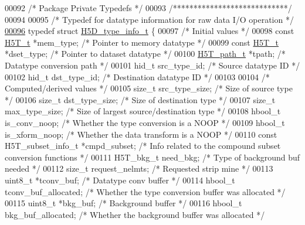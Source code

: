 \begin{DoxyCode}
00092 \textcolor{comment}{/* Package Private Typedefs */}
00093 \textcolor{comment}{/****************************/}
00094 
00095 \textcolor{comment}{/* Typedef for datatype information for raw data I/O operation */}
\hyperlink{struct_h5_d__type__info__t}{00096} \textcolor{keyword}{typedef} \textcolor{keyword}{struct }\hyperlink{struct_h5_d__type__info__t}{H5D\_type\_info\_t} \{
00097     \textcolor{comment}{/* Initial values */}
00098     \textcolor{keyword}{const} \hyperlink{struct_h5_t__t}{H5T\_t} *mem\_type;              \textcolor{comment}{/* Pointer to memory datatype */}
00099     \textcolor{keyword}{const} \hyperlink{struct_h5_t__t}{H5T\_t} *dset\_type;             \textcolor{comment}{/* Pointer to dataset datatype */}
00100     \hyperlink{struct_h5_t__path__t}{H5T\_path\_t} *tpath;                  \textcolor{comment}{/* Datatype conversion path */}
00101     hid\_t src\_type\_id;                  \textcolor{comment}{/* Source datatype ID */}
00102     hid\_t dst\_type\_id;                  \textcolor{comment}{/* Destination datatype ID */}
00103 
00104     \textcolor{comment}{/* Computed/derived values */}
00105     \textcolor{keywordtype}{size\_t} src\_type\_size;       \textcolor{comment}{/* Size of source type  */}
00106     \textcolor{keywordtype}{size\_t} dst\_type\_size;           \textcolor{comment}{/* Size of destination type */}
00107     \textcolor{keywordtype}{size\_t} max\_type\_size;           \textcolor{comment}{/* Size of largest source/destination type */}
00108     hbool\_t is\_conv\_noop;               \textcolor{comment}{/* Whether the type conversion is a NOOP */}
00109     hbool\_t is\_xform\_noop;              \textcolor{comment}{/* Whether the data transform is a NOOP */}
00110     \textcolor{keyword}{const} H5T\_subset\_info\_t *cmpd\_subset;   \textcolor{comment}{/* Info related to the compound subset conversion functions */}
00111     H5T\_bkg\_t need\_bkg;             \textcolor{comment}{/* Type of background buf needed */}
00112     \textcolor{keywordtype}{size\_t} request\_nelmts;      \textcolor{comment}{/* Requested strip mine */}
00113     uint8\_t *tconv\_buf;                 \textcolor{comment}{/* Datatype conv buffer */}
00114     hbool\_t tconv\_buf\_allocated;        \textcolor{comment}{/* Whether the type conversion buffer was allocated */}
00115     uint8\_t *bkg\_buf;                   \textcolor{comment}{/* Background buffer    */}
00116     hbool\_t bkg\_buf\_allocated;          \textcolor{comment}{/* Whether the background buffer was allocated */}

\end{DoxyCode}
